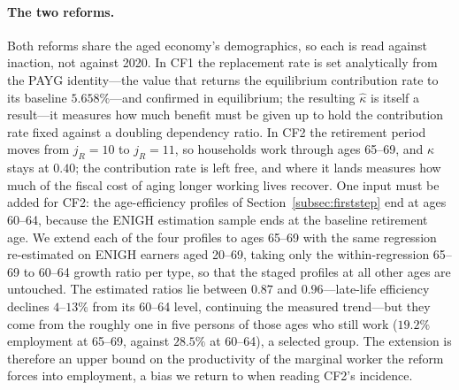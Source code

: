 \documentclass[12pt,a4paper]{article}
\begin{document}
\paragraph{The two reforms.} Both reforms share the aged economy's demographics, so each is read against inaction, not against 2020. In CF1 the replacement rate is set analytically from the PAYG identity---the value that returns the equilibrium contribution rate to its baseline $5.658\%$---and confirmed in equilibrium; the resulting $\widehat\kappa$ is itself a result---it measures how much benefit must be given up to hold the contribution rate fixed against a doubling dependency ratio. In CF2 the retirement period moves from $j_R=10$ to $j_R=11$, so households work through ages 65--69, and $\kappa$ stays at $0.40$; the contribution rate is left free, and where it lands measures how much of the fiscal cost of aging longer working lives recover. One input must be added for CF2: the age-efficiency profiles of Section~\ref{subsec:firststep} end at ages 60--64, because the ENIGH estimation sample ends at the baseline retirement age. We extend each of the four profiles to ages 65--69 with the same regression re-estimated on ENIGH earners aged 20--69, taking only the within-regression 65--69 to 60--64 growth ratio per type, so that the staged profiles at all other ages are untouched. The estimated ratios lie between $0.87$ and $0.96$---late-life efficiency declines $4$--$13\%$ from its 60--64 level, continuing the measured trend---but they come from the roughly one in five persons of those ages who still work ($19.2\%$ employment at 65--69, against $28.5\%$ at 60--64), a selected group. The extension is therefore an upper bound on the productivity of the marginal worker the reform forces into employment, a bias we return to when reading CF2's incidence.
\end{document}
